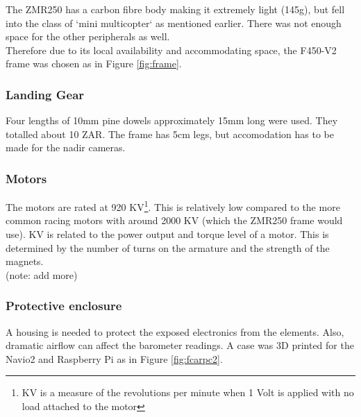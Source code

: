 The ZMR250 has a carbon fibre body making it extremely light (145g), but fell into the class of `mini multicopter` as mentioned earlier. There was not enough space for the other peripherals as well.\\

Therefore due to its local availability and accommodating space, the F450-V2 frame was chosen as in Figure \ref{fig:frame}.

\subsubsection{Landing Gear}

Four lengths of 10mm pine dowels approximately 15mm long were used. They totalled about 10 ZAR. The frame has 5cm legs, but accomodation has to be made for the nadir cameras.

\subsubsection{Motors}

The motors are rated at 920 KV\footnote{KV is a measure of the revolutions per minute when 1 Volt is applied with no load attached to the motor}. This is relatively low compared to the more common racing motors with around 2000 KV (which the ZMR250 frame would use). KV is related to the power output and torque level of a motor. This is determined by the number of turns on the armature and the strength of the magnets.\\

(note: add more)

\subsubsection{Protective enclosure}

A housing is needed to protect the exposed electronics from the elements. Also, dramatic airflow can affect the barometer readings. A case \cite{3d_case} was 3D printed for the Navio2 and Raspberry Pi as in Figure \ref{fig:fcarpc2}.

